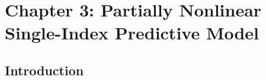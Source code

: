 \documentclass[a4paper,12pt,times,numbered,print,index]{report}
\numberwithin{equation}{section}
\begin{document}
		
		
		
		
		
		
		
		
		
		

		


\chapter*{Chapter 3: Partially Nonlinear Single-Index Predictive Model}

\section{Introduction}
\end{document}

